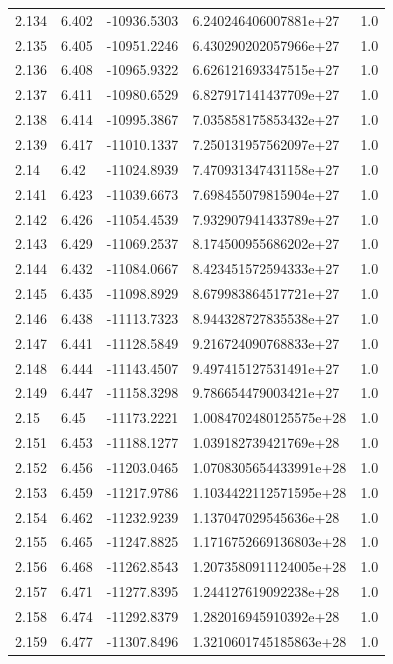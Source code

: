 \begin{tabular}{lllll}
2.134 & 6.402 & -10936.5303 & 6.240246406007881e+27 & 1.0 \\
2.135 & 6.405 & -10951.2246 & 6.430290202057966e+27 & 1.0 \\
2.136 & 6.408 & -10965.9322 & 6.626121693347515e+27 & 1.0 \\
2.137 & 6.411 & -10980.6529 & 6.827917141437709e+27 & 1.0 \\
2.138 & 6.414 & -10995.3867 & 7.035858175853432e+27 & 1.0 \\
2.139 & 6.417 & -11010.1337 & 7.250131957562097e+27 & 1.0 \\
2.14 & 6.42 & -11024.8939 & 7.470931347431158e+27 & 1.0 \\
2.141 & 6.423 & -11039.6673 & 7.698455079815904e+27 & 1.0 \\
2.142 & 6.426 & -11054.4539 & 7.932907941433789e+27 & 1.0 \\
2.143 & 6.429 & -11069.2537 & 8.174500955686202e+27 & 1.0 \\
2.144 & 6.432 & -11084.0667 & 8.423451572594333e+27 & 1.0 \\
2.145 & 6.435 & -11098.8929 & 8.679983864517721e+27 & 1.0 \\
2.146 & 6.438 & -11113.7323 & 8.944328727835538e+27 & 1.0 \\
2.147 & 6.441 & -11128.5849 & 9.216724090768833e+27 & 1.0 \\
2.148 & 6.444 & -11143.4507 & 9.497415127531491e+27 & 1.0 \\
2.149 & 6.447 & -11158.3298 & 9.786654479003421e+27 & 1.0 \\
2.15 & 6.45 & -11173.2221 & 1.0084702480125575e+28 & 1.0 \\
2.151 & 6.453 & -11188.1277 & 1.039182739421769e+28 & 1.0 \\
2.152 & 6.456 & -11203.0465 & 1.0708305654433991e+28 & 1.0 \\
2.153 & 6.459 & -11217.9786 & 1.1034422112571595e+28 & 1.0 \\
2.154 & 6.462 & -11232.9239 & 1.137047029545636e+28 & 1.0 \\
2.155 & 6.465 & -11247.8825 & 1.1716752669136803e+28 & 1.0 \\
2.156 & 6.468 & -11262.8543 & 1.2073580911124005e+28 & 1.0 \\
2.157 & 6.471 & -11277.8395 & 1.244127619092238e+28 & 1.0 \\
2.158 & 6.474 & -11292.8379 & 1.282016945910392e+28 & 1.0 \\
2.159 & 6.477 & -11307.8496 & 1.3210601745185863e+28 & 1.0 \\

\end{tabular}
